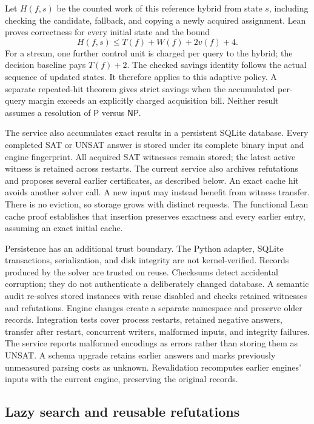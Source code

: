 \documentclass[11pt,a4paper]{article}
\numberwithin{equation}{section}
\newcommand{\Pclass}{\mathsf{P}}
\newcommand{\NPclass}{\mathsf{NP}}
\theoremstyle{plain}
\theoremstyle{definition}
\theoremstyle{remark}
\begin{document}
Let $H(f,s)$ be the counted work of this reference hybrid from state $s$, including checking the candidate, fallback, and copying a newly acquired assignment. Lean proves correctness for every initial state and the bound
\begin{equation}
H(f,s)\leq T(f)+W(f)+2v(f)+4.
\label{eq:concrete-overhead}
\end{equation}
For a stream, one further control unit is charged per query to the hybrid; the decision baseline pays $T(f)+2$. The checked savings identity follows the actual sequence of updated states. It therefore applies to this adaptive policy. A separate repeated-hit theorem gives strict savings when the accumulated per-query margin exceeds an explicitly charged acquisition bill. Neither result assumes a resolution of $\Pclass$ versus $\NPclass$.

The service also accumulates exact results in a persistent SQLite database. Every completed SAT or UNSAT answer is stored under its complete binary input and engine fingerprint. All acquired SAT witnesses remain stored; the latest active witness is retained across restarts. The current service also archives refutations and proposes several earlier certificates, as described below. An exact cache hit avoids another solver call. A new input may instead benefit from witness transfer. There is no eviction, so storage grows with distinct requests. The functional Lean cache proof establishes that insertion preserves exactness and every earlier entry, assuming an exact initial cache.

Persistence has an additional trust boundary. The Python adapter, SQLite transactions, serialization, and disk integrity are not kernel-verified. Records produced by the solver are trusted on reuse. Checksums detect accidental corruption; they do not authenticate a deliberately changed database. A semantic audit re-solves stored instances with reuse disabled and checks retained witnesses and refutations. Engine changes create a separate namespace and preserve older records. Integration tests cover process restarts, retained negative answers, transfer after restart, concurrent writers, malformed inputs, and integrity failures. The service reports malformed encodings as errors rather than storing them as UNSAT. A schema upgrade retains earlier answers and marks previously unmeasured parsing costs as unknown. Revalidation recomputes earlier engines' inputs with the current engine, preserving the original records.


\subsection{Lazy search and reusable refutations}
\label{sec:lazy-search}
\end{document}
